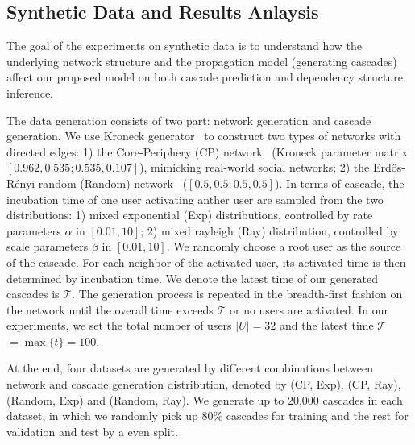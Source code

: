 \subsection{Synthetic Data and Results Anlaysis}
The goal of the experiments on synthetic
data is to understand how the underlying network structure and the propagation
model (generating cascades) affect our proposed model on both cascade prediction and
dependency structure inference. 

The data generation consists of two part: network generation and cascade generation.
We use Kroneck
generator~\cite{LeskovecICML07} to construct two types of networks with directed
edges: 1) the Core-Periphery (CP) network~\cite{LeskovecWWW08} (Kroneck
parameter matrix $[0.962, 0.535; 0.535, 0.107]$), mimicking real-world social networks; 2) the
Erd\H{o}s-R{\'e}nyi random (Random) network~\cite{Erdos60} ($[0.5, 0.5; 0.5, 0.5]$). 
In terms of cascade, the incubation time
of one user activating anther user are sampled from the two distributions: 1)
mixed exponential (Exp) distributions, controlled by rate parameters $\alpha$
in $[0.01, 10]$; 2) mixed rayleigh (Ray) distribution, controlled
by scale parameters $\beta$ in $[0.01, 10]$. 
We randomly choose a root user as the source of the cascade.
For each neighbor of the activated user, its activated time is then determined by
incubation time. 
We denote the latest time of our generated cascades is $\mathcal T$.
The generation process is repeated in the 
breadth-first fashion on the network until the overall time exceeds $\mathcal T$ 
or no users are activated. In our experiments, we set the total
number of users $|U|=32$ and the latest time $\mathcal T$ $= \max\{t\}=100$.

At the end, four datasets are generated by different combinations between
network and cascade generation distribution, denoted by (CP, Exp), (CP, Ray),
(Random, Exp) and (Random, Ray). We generate up to
20,000 cascades in each dataset, in which we randomly pick up 80\% cascades for training and the rest for
 validation and test by a even split. 

